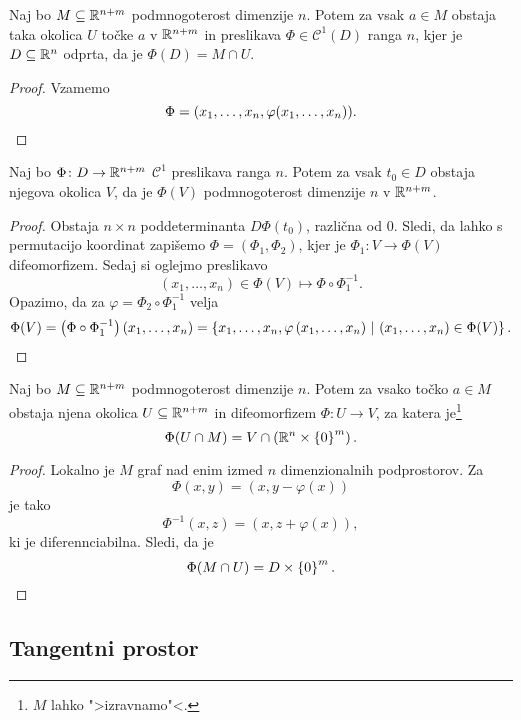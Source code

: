 \begin{trditev}
Naj bo $M \subseteq \mathbb{R}^{n+m}$ podmnogoterost dimenzije $n$. Potem
za vsak $a \in M$ obstaja taka okolica $U$ točke $a$ v $\mathbb{R}^{n+m}$
in preslikava $\Phi \in \mathcal{C}^1(D)$ ranga $n$, kjer je
$D \subseteq \mathbb{R}^n$ odprta, da je $\Phi(D) = M \cap U$.
\end{trditev}

\begin{proof}
Vzamemo
\[
\Phi = (x_1, \dots, x_n, \varphi(x_1, \dots, x_n)). \qedhere
\]
\end{proof}

\begin{trditev}
Naj bo $\Phi \colon D \to \mathbb{R}^{n+m}$ $\mathcal{C}^1$ preslikava
ranga $n$. Potem za vsak $t_0 \in D$ obstaja njegova okolica $V$,
da je $\Phi(V)$ podmnogoterost dimenzije $n$ v $\mathbb{R}^{n+m}$.
\end{trditev}


\begin{proof}
Obstaja $n \times n$ poddeterminanta $D\Phi(t_0)$, različna od $0$.
Sledi, da lahko s permutacijo koordinat zapišemo
$\Phi = (\Phi_1, \Phi_2)$, kjer je $\Phi_1 \colon V \to \Phi(V)$
difeomorfizem. Sedaj si oglejmo preslikavo
\[
(x_1, \dots, x_n) \in \Phi(V) \mapsto \Phi \circ \Phi_1^{-1}.
\]
Opazimo, da za $\varphi = \Phi_2 \circ \Phi_1^{-1}$ velja
\[
\Phi(V) =
\left(\Phi \circ \Phi_1^{-1}\right)(x_1, \dots, x_n) =
\left\{x_1, \dots, x_n, \varphi\left(x_1, \dots, x_n\right)~\middle\vert~(x_1, \dots, x_n) \in \Phi(V)\right\}. \qedhere
\]
\end{proof}

\begin{trditev}
Naj bo $M \subseteq \mathbb{R}^{n+m}$ podmnogoterost dimenzije $n$. Potem
za vsako točko $a \in M$ obstaja njena okolica
$U \subseteq \mathbb{R}^{n+m}$ in difeomorfizem $\Phi \colon U \to V$, za
katera je\footnote{$M$ lahko ">izravnamo"<.}
\[
\Phi(U \cap M) = V \cap \left(\mathbb{R}^n \times \left\{0\right\}^m\right).
\]
\end{trditev}

\begin{proof}
Lokalno je $M$ graf nad enim izmed $n$ dimenzionalnih podprostorov.
Za
\[
\Phi(x,y) = (x, y - \varphi(x))
\]
je tako
\[
\Phi^{-1}(x,z) = (x, z + \varphi(x)),
\]
ki je diferennciabilna. Sledi, da je
\[
\Phi(M \cap U) = D \times \left\{0\right\}^m. \qedhere
\]
\end{proof}

\newpage

\subsection{Tangentni prostor}


